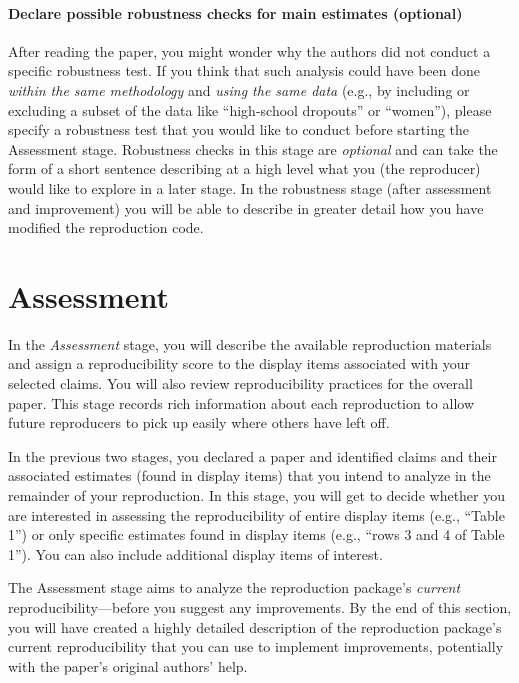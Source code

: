\documentclass[
  openany]{book}
\begin{document}
\hypertarget{declare-possible-robustness-checks-for-main-estimates-optional}{%
\subsubsection*{Declare possible robustness checks for main estimates (optional)}\label{declare-possible-robustness-checks-for-main-estimates-optional}}

After reading the paper, you might wonder why the authors did not conduct a specific robustness test. If you think that such analysis could have been done \emph{within the same methodology} and \emph{using the same data} (e.g., by including or excluding a subset of the data like ``high-school dropouts'' or ``women''), please specify a robustness test that you would like to conduct before starting the Assessment stage. Robustness checks in this stage are \emph{optional} and can take the form of a short sentence describing at a high level what you (the reproducer) would like to explore in a later stage. In the robustness stage (after assessment and improvement) you will be able to describe in greater detail how you have modified the reproduction code.

\hypertarget{assessment}{%
\chapter{Assessment}\label{assessment}}

In the \emph{Assessment} stage, you will describe the available reproduction materials and assign a reproducibility score to the display items associated with your selected claims. You will also review reproducibility practices for the overall paper. This stage records rich information about each reproduction to allow future reproducers to pick up easily where others have left off.

In the previous two stages, you declared a paper and identified claims and their associated estimates (found in display items) that you intend to analyze in the remainder of your reproduction. In this stage, you will get to decide whether you are interested in assessing the reproducibility of entire display items (e.g., ``Table 1'') or only specific estimates found in display items (e.g., ``rows 3 and 4 of Table 1''). You can also include additional display items of interest.

The Assessment stage aims to analyze the reproduction package's \emph{current} reproducibility---before you suggest any improvements. By the end of this section, you will have created a highly detailed description of the reproduction package's current reproducibility that you can use to implement improvements, potentially with the paper's original authors' help.
\end{document}
